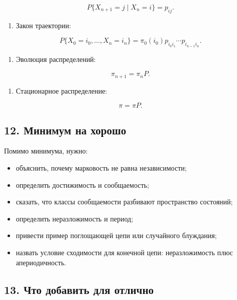 \documentclass[
  11pt,
  a4paper,
]{article}
\providecommand{\tightlist}{%
  \setlength{\itemsep}{0pt}\setlength{\parskip}{0pt}}
\begin{document}
\[
P\{X_{n+1}=j\mid X_n=i\}=p_{ij}.
\]

\begin{enumerate}
\def\labelenumi{\arabic{enumi}.}
\setcounter{enumi}{2}
\tightlist
\item
  Закон траектории:
\end{enumerate}

\[
P\{X_0=i_0,\ldots,X_n=i_n\}
=
\pi_0(i_0)p_{i_0i_1}\cdots p_{i_{n-1}i_n}.
\]

\begin{enumerate}
\def\labelenumi{\arabic{enumi}.}
\setcounter{enumi}{3}
\tightlist
\item
  Эволюция распределений:
\end{enumerate}

\[
\pi_{n+1}=\pi_nP.
\]

\begin{enumerate}
\def\labelenumi{\arabic{enumi}.}
\setcounter{enumi}{4}
\tightlist
\item
  Стационарное распределение:
\end{enumerate}

\[
\pi=\pi P.
\]

\subsection{12. Минимум на
хорошо}\label{ux43cux438ux43dux438ux43cux443ux43c-ux43dux430-ux445ux43eux440ux43eux448ux43e}

Помимо минимума, нужно:

\begin{itemize}
\tightlist
\item
  объяснить, почему марковость не равна независимости;
\item
  определить достижимость и сообщаемость;
\item
  сказать, что классы сообщаемости разбивают пространство состояний;
\item
  определить неразложимость и период;
\item
  привести пример поглощающей цепи или случайного блуждания;
\item
  назвать условие сходимости для конечной цепи: неразложимость плюс
  апериодичность.
\end{itemize}

\subsection{13. Что добавить для
отлично}\label{ux447ux442ux43e-ux434ux43eux431ux430ux432ux438ux442ux44c-ux434ux43bux44f-ux43eux442ux43bux438ux447ux43dux43e}
\end{document}
